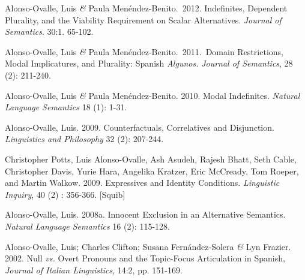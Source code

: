 \documentclass[11pt]{article}
\begin{document}
Alonso-Ovalle, Luis \textit{\&} Paula
    Men\'endez-Benito.\ 2012. Indefinites, Dependent Plurality, and
    the Viability Requirement on Scalar Alternatives. \textit{Journal
      of Semantics}. 30:1. 65-102. %

Alonso-Ovalle, Luis \textit{\&} Paula
    Men\'endez-Benito.\ 2011.\ Domain Restrictions, Modal
    Implicatures, and Plurality: Spanish \textit{Algunos.}
    \textit{Journal of Semantics}, 28 (2): 211-240.


Alonso-Ovalle, Luis \textit{\&} Paula
    Men\'endez-Benito. 2010. Modal Indefinites. \textit{Natural
      Language Semantics} 18 (1): 1-31. 

Alonso-Ovalle, Luis. 2009. Counterfactuals,
  Correlatives and Disjunction. \textit{Linguistics and Philosophy} 32 (2): 207-244.


Christopher Potts, Luis Alonso-Ovalle, Ash Asudeh,
    Rajesh Bhatt, Seth Cable, Christopher Davis, Yurie Hara, Angelika
    Kratzer, Eric McCready, Tom Roeper, and Martin Walkow. 2009. 
  Expressives and Identity Conditions. \textit{Linguistic Inquiry}, 40
  (2) : 356-366. [Squib]

Alonso-Ovalle, Luis. 2008a. Innocent Exclusion in an
  Alternative Semantics. \textit{Natural Language Semantics} 16 (2):
  115-128. 


Alonso-Ovalle, Luis; Charles Clifton; Susana Fern\'andez-Solera \textit{\&} Lyn Frazier. 2002. Null \textit{vs.} Overt Pronouns and the Topic-Focus Articulation in Spanish, \textit{Journal of Italian Linguistics}, 14:2, pp. 151-169. 
\end{document}

